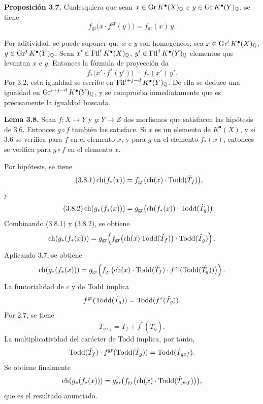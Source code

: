 \textbf{Proposición 3.7.} Cualesquiera que sean
$x\in \operatorname{Gr} K^{\bullet}(X)_{\mathbb Q}$ e
$y\in \operatorname{Gr} K^{\bullet}(Y)_{\mathbb Q}$, se tiene
\[
 f_{\mathrm{gr}}\bigl(x\cdot f^{\mathrm{gr}}(y)\bigr)
 =
 f_{\mathrm{gr}}(x)\,y .
\]

Por aditividad, se puede suponer que \(x\) e \(y\) son homogéneos; sea
$x\in \operatorname{Gr}^iK^{\bullet}(X)_{\mathbb Q}$,
$y\in \operatorname{Gr}^jK^{\bullet}(Y)_{\mathbb Q}$.
Sean $x'\in \operatorname{Fil}^iK^{\bullet}(X)_{\mathbb Q}$,
$y'\in \operatorname{Fil}^jK^{\bullet}(Y)_{\mathbb Q}$ elementos que levantan \(x\) e
\(y\). Entonces la fórmula de proyección da
\[
 f_*\bigl(x'\cdot f^*(y')\bigr)=f_*(x')\,y'.
\]
Por 3.2, esta igualdad se escribe en
\(\operatorname{Fil}^{i+j-d}K^{\bullet}(Y)_{\mathbb Q}\). De ella se deduce una igualdad en
\(\operatorname{Gr}^{i+j-d}K^{\bullet}(Y)_{\mathbb Q}\), y se comprueba inmediatamente que
es precisamente la igualdad buscada.

\textbf{Lema 3.8.} Sean \(f:X\to Y\) y \(g:Y\to Z\) dos morfismos que
satisfacen las hipótesis de 3.6. Entonces \(g\circ f\) también las satisface.
Si \(x\) es un elemento de \(K^{\bullet}(X)\), y si 3.6 se verifica para
\(f\) en el elemento \(x\), y para \(g\) en el elemento \(f_*(x)\), entonces
se verifica para \(g\circ f\) en el elemento \(x\).

Por hipótesis, se tiene
\begin{equation}\tag{3.8.1}
 \operatorname{ch}(f_*(x))=
 f_{\mathrm{gr}}\bigl(\operatorname{ch}(x)\cdot\operatorname{Todd}(\check T_f)\bigr),
\end{equation}
y
\begin{equation}\tag{3.8.2}
 \operatorname{ch}(g_*(f_*(x)))=
 g_{\mathrm{gr}}\bigl(\operatorname{ch}(f_*(x))\cdot\operatorname{Todd}(\check T_g)\bigr).
\end{equation}
Combinando (3.8.1) y (3.8.2), se obtiene
\[
\operatorname{ch}(g_*(f_*(x)))=
g_{\mathrm{gr}}\!\left(
 f_{\mathrm{gr}}\bigl(\operatorname{ch}(x)\operatorname{Todd}(\check T_f)\bigr)\cdot \operatorname{Todd}(\check T_g)
\right).
\]
Aplicando 3.7, se obtiene
\[
\operatorname{ch}(g_*(f_*(x)))=
g_{\mathrm{gr}}\!\left(
 f_{\mathrm{gr}}\bigl(\operatorname{ch}(x)\cdot\operatorname{Todd}(\check T_f)\cdot
 f^{\mathrm{gr}}(\operatorname{Todd}(\check T_g))\bigr)
\right).
\]
La funtorialidad de \(c\) y de \(\operatorname{Todd}\) implica
\[
 f^{\mathrm{gr}}(\operatorname{Todd}(\check T_g))=\operatorname{Todd}(f^*(\check T_g)).
\]
Por 2.7, se tiene
\[
 \check T_{g\circ f}=\check T_f+f^*(\check T_g).
\]
La multiplicatividad del carácter de Todd implica, por tanto,
\[
 \operatorname{Todd}(\check T_f)\cdot f^{\mathrm{gr}}(\operatorname{Todd}(\check T_g))
 =
 \operatorname{Todd}(\check T_{g\circ f}).
\]
Se obtiene finalmente
\[
 \operatorname{ch}(g_*(f_*(x)))=
 g_{\mathrm{gr}}\bigl(f_{\mathrm{gr}}\bigl(\operatorname{ch}(x)\cdot\operatorname{Todd}(\check T_{g\circ f})\bigr)\bigr),
\]
que es el resultado anunciado.


